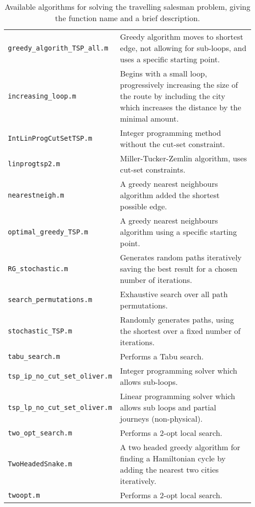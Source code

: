 \begin{table}[hbt]
\begin{center}
\begin{tabularx}{\textwidth}{|L{0.3\textwidth}|X|}
\hdashline
\texttt{greedy\_algorith\_TSP\_all.m} & Greedy algorithm moves to shortest edge, not allowing for sub-loops, and uses a specific starting point. \\
\hdashline
\texttt{increasing\_loop.m} & Begins with a small loop, progressively increasing the size of the route by including the city which increases the distance by the minimal amount. \\
\hdashline
\texttt{IntLinProgCutSetTSP.m} & Integer programming method without the cut-set constraint. \\
\hdashline
\texttt{linprogtsp2.m} &  Miller-Tucker-Zemlin  algorithm, uses cut-set constraints. \\
\hdashline
\texttt{nearestneigh.m} &  A greedy nearest neighbours algorithm added the shortest possible edge.  \\
\hdashline
\texttt{optimal\_greedy\_TSP.m} &  A greedy nearest neighbours algorithm using a specific starting point.  \\
\hdashline
\texttt{RG\_stochastic.m} &  Generates random paths iteratively saving the best result for a chosen number of iterations. \\
\hdashline
\texttt{search\_permutations.m} &  Exhaustive search over all path permutations. \\
\hdashline
\texttt{stochastic\_TSP.m} &  Randomly generates paths, using the shortest over a fixed number of iterations. \\
\hdashline
\texttt{tabu\_search.m} &  Performs a Tabu search. \\
\hdashline
\texttt{tsp\_ip\_no\_cut\_set\_oliver.m} & Integer programming solver which allows sub-loops.\\
\hdashline
\texttt{tsp\_lp\_no\_cut\_set\_oliver.m} & Linear programming solver which allows sub loops and partial journeys (non-physical).\\
\texttt{two\_opt\_search.m} &  Performs a 2-opt local search. \\
\hdashline
\texttt{TwoHeadedSnake.m} &  A two headed greedy algorithm for finding a Hamiltonian cycle by adding the nearest two cities iteratively. \\
\hdashline
\texttt{twoopt.m} &  Performs a 2-opt local search. \\
\hline
\end{tabularx}
\caption{Available algorithms for solving the travelling salesman problem, giving the function name and a brief description.}
\label{tab:brief_algorithm_descriptions}
\end{center}
\end{table}

\clearpage